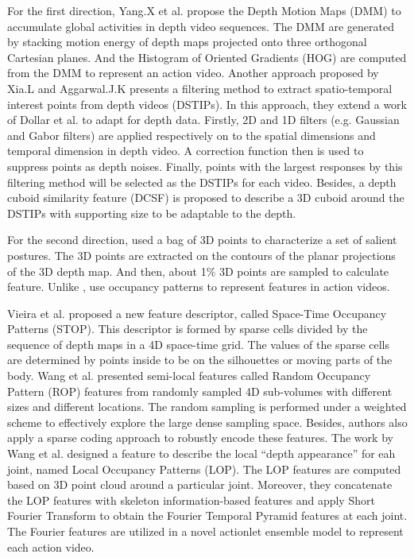 \documentclass[review]{elsarticle}
\begin{document}
For the first direction, Yang.X et al. \cite{yang2012recognizing} propose the Depth Motion Maps (DMM) to accumulate global activities in depth video sequences. The DMM are generated by stacking motion energy of depth maps projected onto three orthogonal Cartesian planes. And the Histogram of Oriented Gradients (HOG) \cite{dalal2005histograms} are computed from the DMM to represent an action video. Another approach proposed by Xia.L and Aggarwal.J.K \cite{xia2013spatio} presents a filtering method to extract spatio-temporal interest points from depth videos (DSTIPs). In this approach, they extend a work of Dollar et al. \cite{dollar2005behavior} to adapt for depth data. Firstly, 2D and 1D filters (e.g. Gaussian and Gabor filters) are applied respectively on to the spatial dimensions and temporal dimension in depth video. A correction function then is used to suppress points as depth noises. Finally, points with the largest responses by this filtering method will be selected as the DSTIPs for each video. Besides, a depth cuboid similarity feature (DCSF) is proposed to describe a 3D cuboid around the DSTIPs with supporting size to be adaptable to the depth.

For the second direction, \cite{li2010action} used a bag of 3D points to characterize a set of salient postures. The 3D points are extracted on the contours of the planar projections of the 3D depth map. And then, about 1\% 3D points are sampled to calculate feature. Unlike \cite{li2010action}, \cite{vieira2012stop, wang2012robust, wang2012mining} use occupancy patterns to represent features in action videos.

Vieira et al. \cite{vieira2012stop} proposed a new feature descriptor, called Space-Time Occupancy Patterns (STOP). This descriptor is formed by sparse cells divided by the sequence of depth maps in a 4D space-time grid. The values of the sparse cells are determined by points inside to be on the silhouettes or moving parts of the body. Wang et al. \cite{wang2012robust} presented semi-local features called Random Occupancy Pattern (ROP) features from randomly sampled 4D sub-volumes with different sizes and different locations. The random sampling is performed under a weighted scheme to effectively explore the large dense sampling space. Besides, authors also apply a sparse coding approach to robustly encode these features. The work by Wang et al. \cite{wang2012mining} designed a feature to describe the local ``depth appearance'' for eah joint, named Local Occupancy Patterns (LOP). The LOP features are computed based on 3D point cloud around a particular joint. Moreover, they concatenate the LOP features with skeleton information-based features and apply Short Fourier Transform to obtain the Fourier Temporal Pyramid features at each joint. The Fourier features are utilized in a novel actionlet ensemble model to represent each action video.
\end{document}
